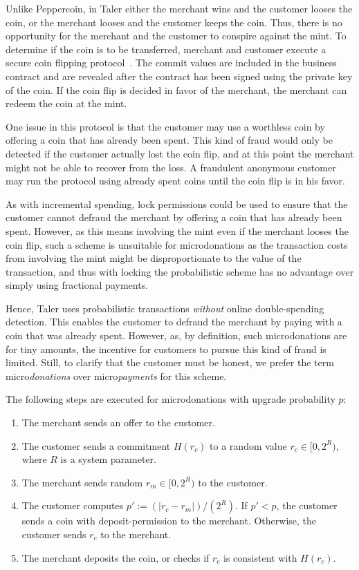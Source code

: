 \documentclass{llncs}
\begin{document}
Unlike Peppercoin, in Taler either the merchant wins and the customer
looses the coin, or the merchant looses and the customer keeps the
coin.  Thus, there is no opportunity for the merchant and the customer
to conspire against the mint.  To determine if the coin is to be
transferred, merchant and customer execute a secure coin flipping
protocol~\cite{blum1981}.  The commit values are included in the
business contract and are revealed after the contract has been signed
using the private key of the coin.  If the coin flip is decided in
favor of the merchant, the merchant can redeem the coin at the mint.

One issue in this protocol is that the customer may use a worthless
coin by offering a coin that has already been spent.  This kind of
fraud would only be detected if the customer actually lost the coin
flip, and at this point the merchant might not be able to recover from
the loss.  A fraudulent anonymous customer may run the protocol using
already spent coins until the coin flip is in his favor.

As with incremental spending, lock permissions could be used to ensure
that the customer cannot defraud the merchant by offering a coin that
has already been spent.  However, as this means involving the mint
even if the merchant looses the coin flip, such a scheme is unsuitable
for microdonations as the transaction costs from involving the mint
might be disproportionate to the value of the transaction, and thus
with locking the probabilistic scheme has no advantage over simply
using fractional payments.

Hence, Taler uses probabilistic transactions {\em without} online
double-spending detection.  This enables the customer to defraud the
merchant by paying with a coin that was already spent.  However, as,
by definition, such microdonations are for tiny amounts, the incentive
for customers to pursue this kind of fraud is limited.  Still, to
clarify that the customer must be honest, we prefer the term
micro{\em donations} over micro{\em payments} for this scheme.


The following steps are executed for microdonations with upgrade probability $p$:
\begin{enumerate}
  \item The merchant sends an offer to the customer.
  \item The customer sends a commitment $H(r_c)$ to a random
    value $r_c \in [0,2^R)$, where $R$ is a system parameter.
  \item The merchant sends random $r_m \in [0,2^R)$ to the customer.
    \item The customer computes $p' := (|r_c - r_m|) / (2^R)$.
    If $p' < p$, the customer sends a coin with deposit-permission to the merchant.
    Otherwise, the customer sends $r_c$ to the merchant.
  \item The merchant deposits the coin, or checks if $r_c$ is consistent
    with $H(r_c)$.
\end{enumerate}
\end{document}
